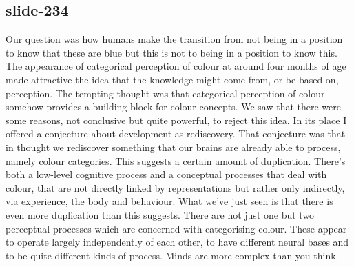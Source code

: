 \documentclass[12pt,\papersize]{extarticle}
\begin{document}
\subsection{slide-234}
Our question was how humans make the transition from not being in a position to know that these are blue but this is not to being in a position to know this.
The appearance of categorical perception of colour at around four months of age made attractive the idea that the knowledge might come from, or be based on, perception.
The tempting thought was that categorical perception of colour somehow provides a building block for colour concepts.
We saw that there were some reasons, not conclusive but quite powerful, to reject this idea.
In its place I offered a conjecture about development as rediscovery.
That conjecture was that in thought we rediscover something that our brains are already able to process, namely colour categories.
This suggests a certain amount of duplication. There's both a low-level cognitive process and a conceptual processes that deal with colour, that are not directly linked by representations but rather only indirectly, via experience, the body and behaviour.
What we've just seen is that there is even more duplication than this suggests.
There are not just one but two perceptual processes which are concerned with categorising colour.
These appear to operate largely independently of each other, to have different neural bases and to be quite different kinds of process.
Minds are more complex than you think.


 






\end{document}
